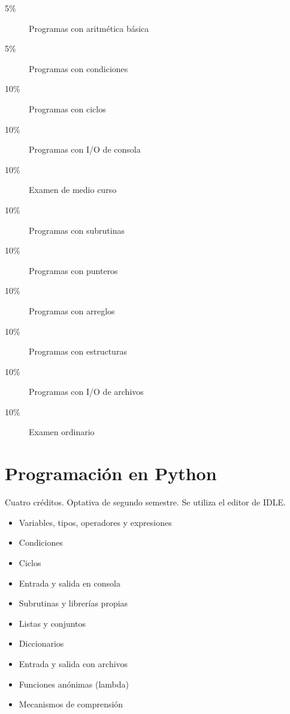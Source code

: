 \documentclass{article}
\begin{document}
\begin{multicols}{4}
\begin{description}
\item[5\%]{Programas con aritm\'{e}tica b\'{a}sica}
\item[5\%]{Programas con condiciones} 
\item[10\%]{Programas con ciclos}
\item[10\%]{Programas con I/O de consola}
\item[10\%]{Examen de medio curso}
\item[10\%]{Programas con subrutinas}
\item[10\%]{Programas con punteros}
\item[10\%]{Programas con arreglos}
\item[10\%]{Programas con estructuras}
\item[10\%]{Programas con I/O de archivos}            
\item[10\%]{Examen ordinario}
\end{description}

\vfill\null \columnbreak

\hypertarget{pep}{\section*{Programaci\'{o}n en Python}}

Cuatro cr\'{e}ditos. Optativa de segundo semestre. Se utiliza el
editor de IDLE.

\begin{itemize}
\item{Variables, tipos, operadores y expresiones}
\item{Condiciones}
\item{Ciclos}
\item{Entrada y salida en consola}  
\item{Subrutinas y librer\'{i}as propias}
\item{Listas y conjuntos}
\item{Diccionarios}  
\item{Entrada y salida con archivos}    
\item{Funciones an\'{o}nimas (lambda)}
\item{Mecanismos de comprensi\'{o}n}
\end{itemize}


\end{multicols}
\end{document}
